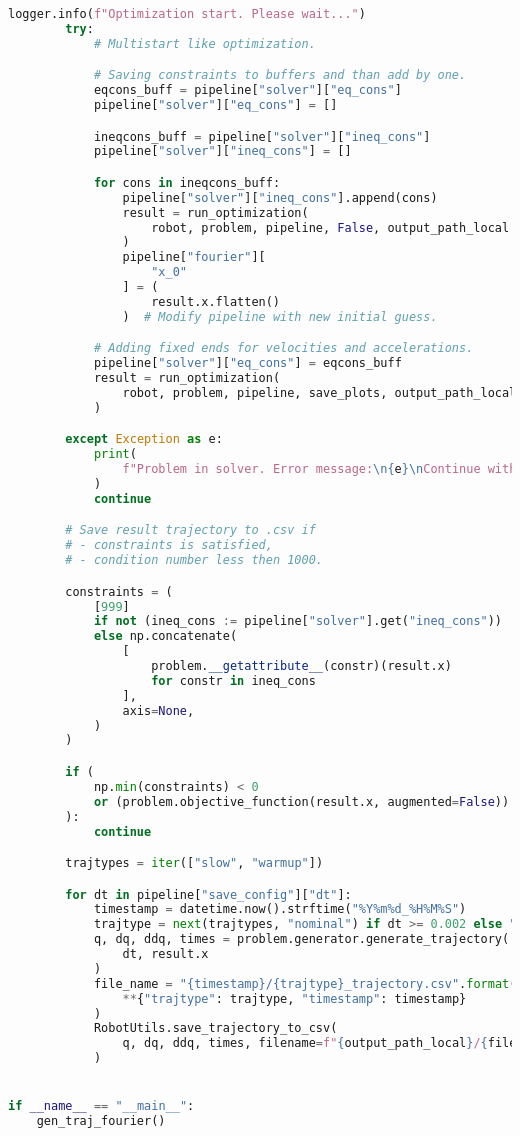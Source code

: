 \begin{lstlisting}[language=python, caption=\raggedright{generation/gen\_trajectory\_fourier.py}, frame=single]
        logger.info(f"Optimization start. Please wait...")
        try:
            # Multistart like optimization.

            # Saving constraints to buffers and than add by one.
            eqcons_buff = pipeline["solver"]["eq_cons"]
            pipeline["solver"]["eq_cons"] = []

            ineqcons_buff = pipeline["solver"]["ineq_cons"]
            pipeline["solver"]["ineq_cons"] = []

            for cons in ineqcons_buff:
                pipeline["solver"]["ineq_cons"].append(cons)
                result = run_optimization(
                    robot, problem, pipeline, False, output_path_local
                )
                pipeline["fourier"][
                    "x_0"
                ] = (
                    result.x.flatten()
                )  # Modify pipeline with new initial guess.

            # Adding fixed ends for velocities and accelerations.
            pipeline["solver"]["eq_cons"] = eqcons_buff
            result = run_optimization(
                robot, problem, pipeline, save_plots, output_path_local
            )

        except Exception as e:
            print(
                f"Problem in solver. Error message:\n{e}\nContinue with next pipeline..."
            )
            continue

        # Save result trajectory to .csv if
        # - constraints is satisfied,
        # - condition number less then 1000.

        constraints = (
            [999]
            if not (ineq_cons := pipeline["solver"].get("ineq_cons"))
            else np.concatenate(
                [
                    problem.__getattribute__(constr)(result.x)
                    for constr in ineq_cons
                ],
                axis=None,
            )
        )

        if (
            np.min(constraints) < 0
            or (problem.objective_function(result.x, augmented=False)) > 1000
        ):
            continue

        trajtypes = iter(["slow", "warmup"])

        for dt in pipeline["save_config"]["dt"]:
            timestamp = datetime.now().strftime("%Y%m%d_%H%M%S")
            trajtype = next(trajtypes, "nominal") if dt >= 0.002 else "nominal"
            q, dq, ddq, times = problem.generator.generate_trajectory(
                dt, result.x
            )
            file_name = "{timestamp}/{trajtype}_trajectory.csv".format(
                **{"trajtype": trajtype, "timestamp": timestamp}
            )
            RobotUtils.save_trajectory_to_csv(
                q, dq, ddq, times, filename=f"{output_path_local}/{file_name}"
            )


if __name__ == "__main__":
    gen_traj_fourier()

\end{lstlisting}